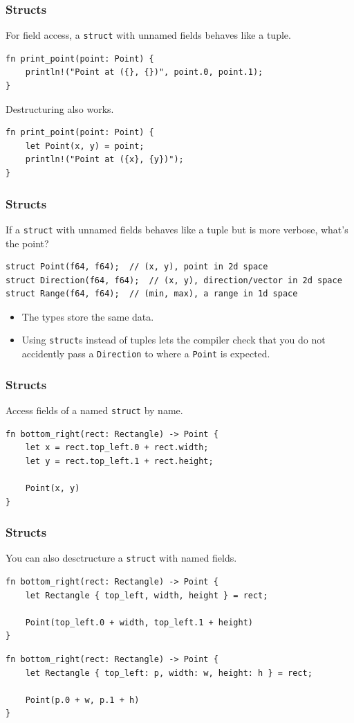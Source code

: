 \begin{frame}[fragile]
    \frametitle{Structs}
    For field access, a \texttt{struct} with unnamed fields behaves like a tuple.
    \pause
    \vfill
    \begin{verbatim}
fn print_point(point: Point) {
    println!("Point at ({}, {})", point.0, point.1);
}
    \end{verbatim}
    \pause
    \vfill
    Destructuring also works.
    \begin{verbatim}
fn print_point(point: Point) {
    let Point(x, y) = point;
    println!("Point at ({x}, {y})");
}
    \end{verbatim}
\end{frame}

\begin{frame}[fragile]
    \frametitle{Structs}
    If a \texttt{struct} with unnamed fields behaves like a tuple but is more verbose, what's the point?
    \pause
    \vfill
    \begin{verbatim}
struct Point(f64, f64);  // (x, y), point in 2d space
struct Direction(f64, f64);  // (x, y), direction/vector in 2d space
struct Range(f64, f64);  // (min, max), a range in 1d space
    \end{verbatim}
    \begin{itemize}
        \item The types store the same data.
        \pause
        \vfill
        \item Using \texttt{struct}s instead of tuples lets the compiler check that you do not accidently pass a \texttt{Direction} to where a \texttt{Point} is expected.
    \end{itemize}
\end{frame}

\begin{frame}[fragile]
    \frametitle{Structs}
    Access fields of a named \texttt{struct} by name.
    \pause
    \vfill
    \begin{verbatim}
fn bottom_right(rect: Rectangle) -> Point {
    let x = rect.top_left.0 + rect.width;
    let y = rect.top_left.1 + rect.height;

    Point(x, y)
}
    \end{verbatim}
\end{frame}

\begin{frame}[fragile]
    \frametitle{Structs}
    You can also desctructure a \texttt{struct} with named fields.
    \pause
    \vfill
    \begin{verbatim}
fn bottom_right(rect: Rectangle) -> Point {
    let Rectangle { top_left, width, height } = rect;

    Point(top_left.0 + width, top_left.1 + height)
}
    \end{verbatim}
    \pause
    \vfill
    \begin{verbatim}
fn bottom_right(rect: Rectangle) -> Point {
    let Rectangle { top_left: p, width: w, height: h } = rect;

    Point(p.0 + w, p.1 + h)
}
    \end{verbatim}
\end{frame}

